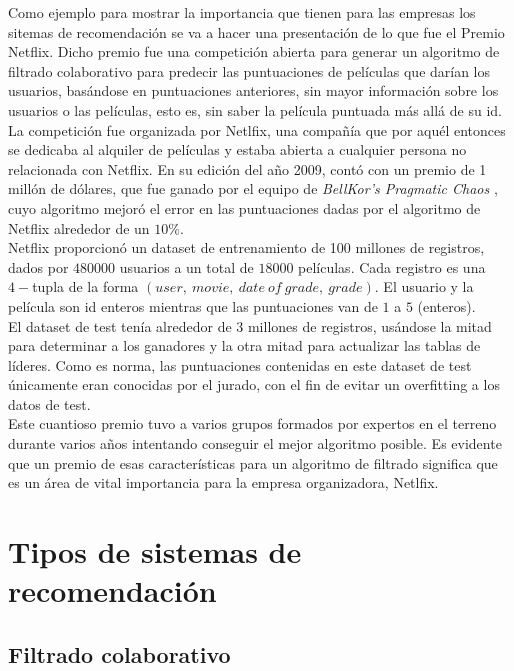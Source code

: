 Como ejemplo para mostrar la importancia que tienen para las empresas los sitemas de recomendación se va a hacer una presentación de lo que fue el Premio Netflix. Dicho premio fue una competición abierta para generar un algoritmo de filtrado colaborativo para predecir las puntuaciones de películas que darían los usuarios, basándose en puntuaciones anteriores, sin mayor información sobre los usuarios o las películas, esto es, sin saber la película puntuada más allá de su id.\\

La competición fue organizada por Netlfix, una compañía que por aquél entonces se dedicaba al alquiler de películas y estaba abierta a cualquier persona no relacionada con Netflix. En su edición del año 2009, contó con un premio de 1 millón de dólares, que fue ganado por el equipo de \textit{BellKor's Pragmatic Chaos} \cite{netflix}, cuyo algoritmo mejoró el  error en las puntuaciones dadas por el algoritmo de Netflix alrededor de un $10 \%$.\\

Netflix proporcionó un dataset de entrenamiento de 100 millones de registros, dados por $480000$ usuarios a un total de $18000$ películas. Cada registro es una $4-$tupla de la forma $(user,\ movie,\ date\ of\ grade,\ grade)$. El usuario y la película son id enteros mientras que las puntuaciones van de $1$ a $5$ (enteros).\\

El dataset de test tenía alrededor de 3 millones de registros, usándose la mitad para determinar a los ganadores y la otra mitad para actualizar las tablas de líderes. Como es norma, las puntuaciones contenidas en este dataset de test únicamente eran conocidas por el jurado, con el fin de evitar un overfitting a los datos de test.\\

Este cuantioso premio tuvo a varios grupos formados por expertos en el terreno durante varios años intentando conseguir el mejor algoritmo posible. Es evidente que un premio de esas características para un algoritmo de filtrado significa que es un área de vital importancia para la empresa organizadora, Netlfix.

\newpage

\section{Tipos de sistemas de recomendación}

\subsection{Filtrado colaborativo}

